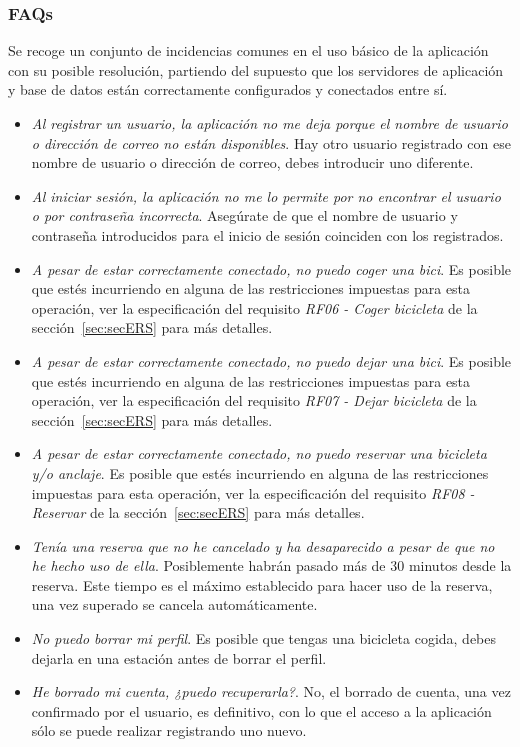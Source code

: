 \subsubsection{FAQs}

Se recoge un conjunto de incidencias comunes en el uso básico de la aplicación con su posible resolución, partiendo del supuesto que los servidores de aplicación y base de datos están correctamente configurados y conectados entre sí.

\begin{itemize}
	
	\item \textit{Al registrar un usuario, la aplicación no me deja porque el nombre de usuario o dirección de correo no están disponibles}. Hay otro usuario registrado con ese nombre de usuario o dirección de correo, debes introducir uno diferente.
	
	\item \textit{Al iniciar sesión, la aplicación no me lo permite por no encontrar el usuario o por contraseña incorrecta}. Asegúrate de que el nombre de usuario y contraseña introducidos para el inicio de sesión coinciden con los registrados.
	
	\item \textit{A pesar de estar correctamente conectado, no puedo coger una bici}. Es posible que estés incurriendo en alguna de las restricciones impuestas para esta operación, ver la especificación del requisito \emph{RF06 - Coger bicicleta} de la sección~\ref{sec:secERS} para más detalles.
	
	\item \textit{A pesar de estar correctamente conectado, no puedo dejar una bici}. Es posible que estés incurriendo en alguna de las restricciones impuestas para esta operación, ver la especificación del requisito \emph{RF07 - Dejar bicicleta} de la sección~\ref{sec:secERS} para más detalles.
	
	\item \textit{A pesar de estar correctamente conectado, no puedo reservar una bicicleta y/o anclaje}. Es posible que estés incurriendo en alguna de las restricciones impuestas para esta operación, ver la especificación del requisito \emph{RF08 - Reservar} de la sección~\ref{sec:secERS} para más detalles.
	
	\item \textit{Tenía una reserva que no he cancelado y ha desaparecido a pesar de que no he hecho uso de ella}. Posiblemente habrán pasado más de 30 minutos desde la reserva. Este tiempo es el máximo establecido para hacer uso de la reserva, una vez superado se cancela automáticamente.
	
	\item \textit{No puedo borrar mi perfil}. Es posible que tengas una bicicleta cogida, debes dejarla en una estación antes de borrar el perfil.
	
	\item \textit{He borrado mi cuenta, ¿puedo recuperarla?}. No, el borrado de cuenta, una vez confirmado por el usuario, es definitivo, con lo que el acceso a la aplicación sólo se puede realizar registrando uno nuevo.
	
\end{itemize}





